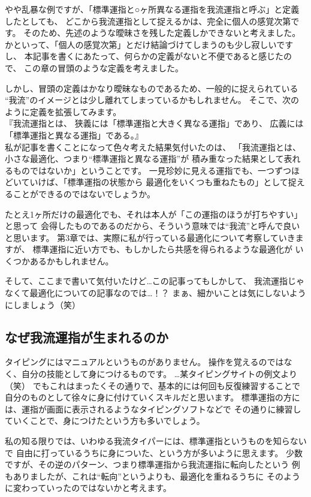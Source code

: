 やや乱暴な例ですが、「標準運指と○ヶ所異なる運指を我流運指と呼ぶ」と定義したとしても、
どこから我流運指として捉えるかは、完全に個人の感覚次第です。
そのため、先述のような曖昧さを残した定義しかできないと考えました。
かといって、「個人の感覚次第」とだけ結論づけてしまうのも少し寂しいですし、
本記事を書くにあたって、何らかの定義がないと不便であると感じたので、
この章の冒頭のような定義を考えました。

しかし、冒頭の定義はかなり曖昧なものであるため、一般的に捉えられている
“我流”のイメージとは少し離れてしまっているかもしれません。
そこで、次のように定義を拡張してみます。\\

『我流運指とは、
狭義には「標準運指と大きく異なる運指」であり、
広義には「標準運指と異なる運指」である。』\\

私が記事を書くことになって色々考えた結果気付いたのは、
「我流運指とは、小さな最適化、つまり“標準運指と異なる運指”が
積み重なった結果として表れるものではないか」ということです。
一見珍妙に見える運指でも、一つずつほどいていけば、「標準運指の状態から
最適化をいくつも重ねたもの」として捉えることができるのではないでしょうか。

たとえ1ヶ所だけの最適化でも、それは本人が「この運指のほうが打ちやすい」と思って
会得したものであるのだから、そういう意味では“我流”と呼んで良いと思います。
第3章では、実際に私が行っている最適化について考察していきますが、
標準運指に近い方でも、もしかしたら共感を得られるような最適化が
いくつかあるかもしれません。

そして、ここまで書いて気付いたけど…この記事ってもしかして、
我流運指じゃなくて最適化についての記事なのでは…！？
まぁ、細かいことは気にしないようにしましょう（笑）



\subsection{なぜ我流運指が生まれるのか}


タイピングにはマニュアルというものがありません。
操作を覚えるのではなく、自分の技能として身につけるものです。
…某タイピングサイトの例文より（笑）
でもこれはまったくその通りで、基本的には何回も反復練習することで
自分のものとして徐々に身に付けていくスキルだと思います。
標準運指の方には、運指が画面に表示されるようなタイピングソフトなどで
その通りに練習していくことで、身につけたという方も多いでしょう。

私の知る限りでは、いわゆる我流タイパーには、標準運指というものを知らないで
自由に打っているうちに身についた、という方が多いように思えます。
少数ですが、その逆のパターン、つまり標準運指から我流運指に転向したという
例もありましたが、これは“転向”というよりも、最適化を重ねるうちに
そのように変わっていったのではないかと考えます。


